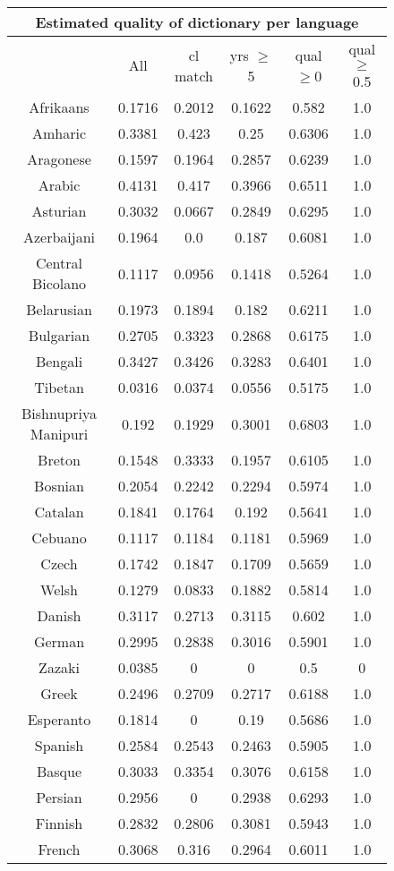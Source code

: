 \begin{figure}[h]
\centering
\begin{tabular}{cccccc}
\multicolumn{6}{c}{Estimated quality of dictionary per language}\\
\hline\hline
&All&cl match&yrs $\geq$ 5&qual$\geq$0&qual$\geq$0.5\\
\hline\hline
Afrikaans&0.1716&0.2012&0.1622&0.582&1.0\\
Amharic&0.3381&0.423&0.25&0.6306&1.0\\
Aragonese&0.1597&0.1964&0.2857&0.6239&1.0\\
Arabic&0.4131&0.417&0.3966&0.6511&1.0\\
Asturian&0.3032&0.0667&0.2849&0.6295&1.0\\
Azerbaijani&0.1964&0.0&0.187&0.6081&1.0\\
Central Bicolano&0.1117&0.0956&0.1418&0.5264&1.0\\
Belarusian&0.1973&0.1894&0.182&0.6211&1.0\\
Bulgarian&0.2705&0.3323&0.2868&0.6175&1.0\\
Bengali&0.3427&0.3426&0.3283&0.6401&1.0\\
Tibetan&0.0316&0.0374&0.0556&0.5175&1.0\\
Bishnupriya Manipuri&0.192&0.1929&0.3001&0.6803&1.0\\
Breton&0.1548&0.3333&0.1957&0.6105&1.0\\
Bosnian&0.2054&0.2242&0.2294&0.5974&1.0\\
Catalan&0.1841&0.1764&0.192&0.5641&1.0\\
Cebuano&0.1117&0.1184&0.1181&0.5969&1.0\\
Czech&0.1742&0.1847&0.1709&0.5659&1.0\\
Welsh&0.1279&0.0833&0.1882&0.5814&1.0\\
Danish&0.3117&0.2713&0.3115&0.602&1.0\\
German&0.2995&0.2838&0.3016&0.5901&1.0\\
Zazaki&0.0385&0&0&0.5&0\\
Greek&0.2496&0.2709&0.2717&0.6188&1.0\\
Esperanto&0.1814&0&0.19&0.5686&1.0\\
Spanish&0.2584&0.2543&0.2463&0.5905&1.0\\
Basque&0.3033&0.3354&0.3076&0.6158&1.0\\
Persian&0.2956&0&0.2938&0.6293&1.0\\
Finnish&0.2832&0.2806&0.3081&0.5943&1.0\\
French&0.3068&0.316&0.2964&0.6011&1.0\\

\end{tabular}
\end{figure}
